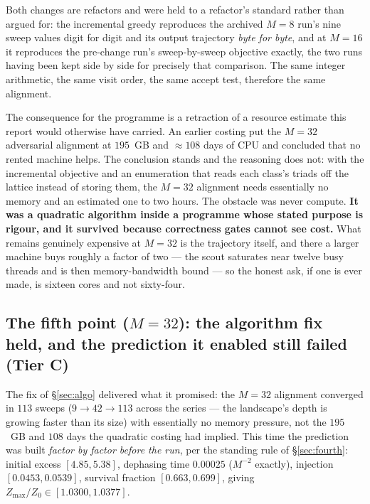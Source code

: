 \documentclass[11pt,a4paper]{article}
\newcommand{\tC}{\textcolor{TierC}{\textbf{Tier C}}}
\theoremstyle{definition}
\theoremstyle{plain}
\begin{document}
Both changes are refactors and were held to a refactor's standard rather than argued for: the
incremental greedy reproduces the archived $M=8$ run's nine sweep values digit for digit and its
output trajectory \emph{byte for byte}, and at $M=16$ it reproduces the pre-change run's
sweep-by-sweep objective exactly, the two runs having been kept side by side for precisely that
comparison. The same integer arithmetic, the same visit order, the same accept test, therefore
the same alignment.

The consequence for the programme is a retraction of a resource estimate this report would
otherwise have carried. An earlier costing put the $M=32$ adversarial alignment at $195$~GB and
$\approx 108$ days of CPU and concluded that no rented machine helps. The conclusion stands and
the reasoning does not: with the incremental objective and an enumeration that reads each
class's triads off the lattice instead of storing them, the $M=32$ alignment needs essentially no
memory and an estimated one to two hours. The obstacle was never compute. \textbf{It was a
quadratic algorithm inside a programme whose stated purpose is rigour, and it survived because
correctness gates cannot see cost.} What remains genuinely expensive at $M=32$ is the trajectory
itself, and there a larger machine buys roughly a factor of two --- the scout saturates near
twelve busy threads and is then memory-bandwidth bound --- so the honest ask, if one is ever
made, is sixteen cores and not sixty-four.

\subsection{The fifth point ($M=32$): the algorithm fix held, and the prediction it enabled
still failed (\tC{})}
\label{sec:fifth}

The fix of \S\ref{sec:algo} delivered what it promised: the $M=32$ alignment converged in
$113$ sweeps ($9\to42\to113$ across the series --- the landscape's depth is growing faster than
its size) with essentially no memory pressure, not the $195$~GB and $108$ days the quadratic
costing had implied. This time the prediction was built \emph{factor by factor before the run},
per the standing rule of \S\ref{sec:fourth}: initial excess $[4.85,5.38]$, dephasing time
$0.00025$ ($M^{-2}$ exactly), injection $[0.0453,0.0539]$, survival fraction
$[0.663,0.699]$, giving $Z_{\max}/Z_0\in[1.0300,1.0377]$.
\end{document}
